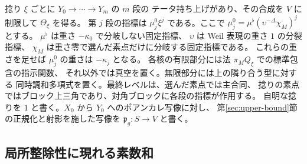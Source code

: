 捻り \(\xi\) ごとに \(Y_0\to\cdots\to Y_m\) の \(m\) 段の
テータ持ち上げがあり、その合成を \(V\) に制限して \(\Theta_\xi\) を得る。
第 \(j\) 段の指標は \(\mu_j^0\xi^j\) である。ここで
\(\mu_j^0=\mu^\flat(\upsilon^{-\Delta}\chi_M)^j\) とする。
\(\mu^\flat\) は重さ \(-\kappa_0\) で分岐しない固定指標、
\(\upsilon\) は Weil 表現の重さ \(1\) の分裂指標、
\(\chi_M\) は重さ零で選んだ素点だけに分岐する固定指標である。
これらの重さを足せば \(\mu_j^0\) の重さは \(-\kappa_j\) となる。
各核の有限部分には法 \(\pi_M Q_\xi\) での標準包含の指示関数、
それ以外では真空を置く。無限部分には上の隣り合う型に対する
同時調和多項式を置く。最終レベルは、選んだ素点では主合同、
捻りの素点ではブロック上三角であり、対角ブロックに各段の指標が作用する。
自明な捻りを \(1\) と書く。\(X_0\) から \(Y_0\) へのポアンカレ写像に対し、
第\ref{sec:upper-bound}節の正規化と射影を施した写像を
\(\mathfrak p_g\colon S\to V\) と書く。

\subsection{局所整除性に現れる素数和}

